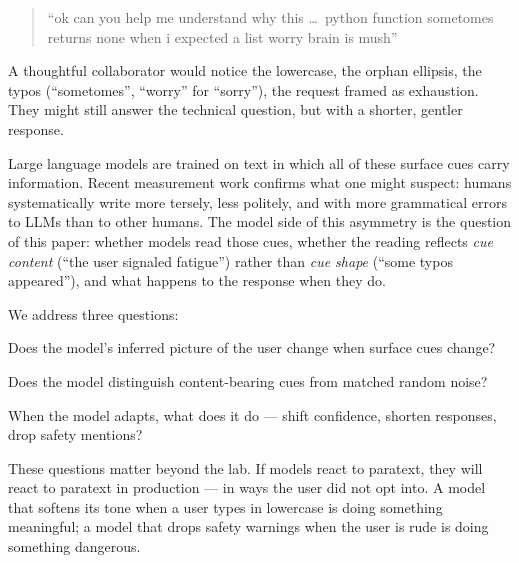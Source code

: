 \documentclass[10pt, letterpaper]{article}
\begin{document}
\begin{quote}
``ok can you help me understand why this \ldots\ python function sometomes returns none when i expected a list worry brain is mush''
\end{quote}

A thoughtful collaborator would notice the lowercase, the orphan ellipsis, the typos (``sometomes'', ``worry'' for ``sorry''), the request framed as exhaustion. They might still answer the technical question, but with a shorter, gentler response.

Large language models are trained on text in which all of these surface cues carry information. Recent measurement work \cite{mindthegap2025} confirms what one might suspect: humans systematically write more tersely, less politely, and with more grammatical errors to LLMs than to other humans. The model side of this asymmetry is the question of this paper: whether models read those cues, whether the reading reflects \emph{cue content} (``the user signaled fatigue'') rather than \emph{cue shape} (``some typos appeared''), and what happens to the response when they do.

We address three questions:
\begin{description}[leftmargin=1.5em, itemsep=0pt]
  \item[Sensitivity.] Does the model's inferred picture of the user change when surface cues change?
  \item[Specificity.] Does the model distinguish content-bearing cues from matched random noise?
  \item[Behavioral adaptation.] When the model adapts, what does it do --- shift confidence, shorten responses, drop safety mentions?
\end{description}

These questions matter beyond the lab. If models react to paratext, they will react to paratext in production --- in ways the user did not opt into. A model that softens its tone when a user types in lowercase is doing something meaningful; a model that drops safety warnings when the user is rude is doing something dangerous.
\end{document}
